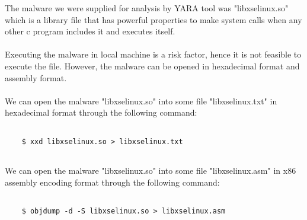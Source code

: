 The malware we were supplied for analysis by YARA tool was "libxselinux.so" which is a library file that has powerful properties to make system calls when any other c program includes it and executes itself.\\
\\
Executing the malware in local machine is a risk factor, hence it is not feasible to execute the file. However, the malware can be opened in hexadecimal format and assembly format.\\
\\
We can open the malware "libxselinux.so" into some file "libxselinux.txt" in hexadecimal format through the following command:

\begin{verbatim}

    $ xxd libxselinux.so > libxselinux.txt
    
\end{verbatim}
We can open the malware "libxselinux.so" into some file "libxselinux.asm" in x86 assembly encoding format through the following command:

\begin{verbatim}

    $ objdump -d -S libxselinux.so > libxselinux.asm
    
\end{verbatim}